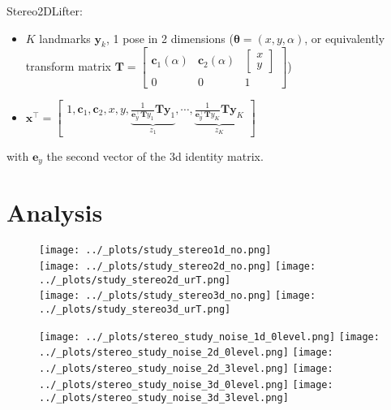 \documentclass[11pt]{article}
\providecommand{\tightlist}{%
  \setlength{\itemsep}{0pt}\setlength{\parskip}{0pt}}
\newcommand{\vc}[1]{\ensuremath{\bm{#1}}}
\begin{document}
Stereo2DLifter:

\begin{itemize}
\tightlist
\item \(K\) landmarks \(\vc{y}_k\), 1 pose in 2 dimensions (\(\vc{\theta}=(x, y, \alpha)\), or equivalently transform matrix \(\vc{T}=\begin{bmatrix} \vc{c}_1(\alpha) & \vc{c}_2(\alpha) & \begin{bmatrix} x \\ y \end{bmatrix} \\ 0 & 0 & 1 \end{bmatrix}\))
\item \(\vc{x}^\top = \begin{bmatrix} 1, \vc{c}_1, \vc{c}_2, x, y, \underbrace{\frac{1}{\vc{e}_y^\top\vc{T}{y}_1}\vc{T}\vc{y}_1}_{z_1}, \cdots, \underbrace{\frac{1}{\vc{e}_y^\top\vc{T}{y}_K}\vc{T}\vc{y}_K}_{z_K}\end{bmatrix}\)
\end{itemize}

with \(\vc{e}_y\) the second vector of the 3d identity matrix.

\newpage
\FloatBarrier
\section{Analysis}

\begin{figure}[h]
  \centering
  \texttt{[image: ../\_plots/study\_stereo1d\_no.png]} \\
  \texttt{[image: ../\_plots/study\_stereo2d\_no.png]} 
  \texttt{[image: ../\_plots/study\_stereo2d\_urT.png]} \\
  \texttt{[image: ../\_plots/study\_stereo3d\_no.png]} 
  \texttt{[image: ../\_plots/study\_stereo3d\_urT.png]}
  \label{fig:noise}
\end{figure}


\begin{figure}[h]
  \centering
  \texttt{[image: ../\_plots/stereo\_study\_noise\_1d\_0level.png]}
  \texttt{[image: ../\_plots/stereo\_study\_noise\_2d\_0level.png]}
  \texttt{[image: ../\_plots/stereo\_study\_noise\_2d\_3level.png]}
  \texttt{[image: ../\_plots/stereo\_study\_noise\_3d\_0level.png]}
  \texttt{[image: ../\_plots/stereo\_study\_noise\_3d\_3level.png]}
  \label{fig:noise}
\end{figure}
\end{document}
